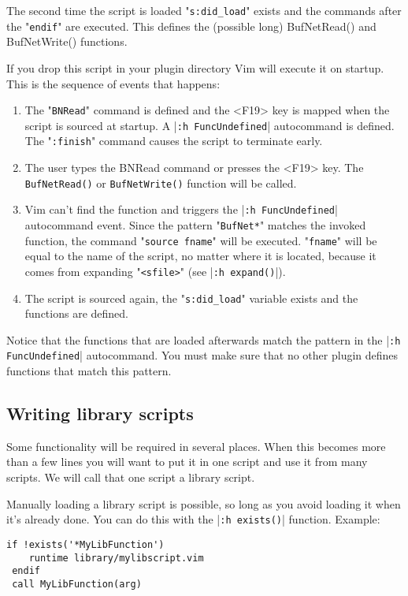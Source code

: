 The second time the script is loaded "\verb!s:did_load!" exists and the commands after the "\verb!endif!" are executed.
This defines the (possible long) BufNetRead() and BufNetWrite() functions.

If you drop this script in your plugin directory Vim will execute it on startup.
This is the sequence of events that happens:

\begin{enumerate}
				\item The "\verb!BNRead!" command is defined and the <F19> key is mapped when the script is sourced at startup.
								A |\verb!:h FuncUndefined!| autocommand is defined.
								The "\verb!:finish!" command causes the script to terminate early.
				\item The user types the BNRead command or presses the <F19> key.
								The \verb!BufNetRead()! or \verb!BufNetWrite()! function will be called.
				\item Vim can't find the function and triggers the |\verb!:h FuncUndefined!| autocommand event.
								Since the pattern "\verb!BufNet*!" matches the invoked function, the command "\verb!source fname!" will be executed.
								"\verb!fname!" will be equal to the name of the script, no matter where it is located, because it comes from expanding "\verb!<sfile>!" (see |\verb!:h expand()!|).
				\item The script is sourced again, the "\verb!s:did_load!" variable exists and the functions are defined.
\end{enumerate}

Notice that the functions that are loaded afterwards match the pattern in the |\verb!:h FuncUndefined!| autocommand.
You must make sure that no other plugin defines functions that match this pattern.
\subsection{Writing library scripts}
\label{Writing library scripts}
\label{write-library-script}
Some functionality will be required in several places.
When this becomes more than a few lines you will want to put it in one script and use it from many scripts.
We will call that one script a library script.

Manually loading a library script is possible, so long as you avoid loading it when it's already done.
You can do this with the |\verb!:h exists()!| function.
Example:

\begin{Verbatim}[samepage=true]
 if !exists('*MyLibFunction')
    runtime library/mylibscript.vim
 endif
 call MyLibFunction(arg)
\end{Verbatim}

